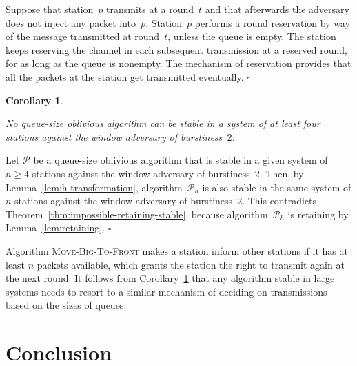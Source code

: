 \documentclass[11pt]{article}
\newcommand{\cP}{\mathcal{P}}
\newcommand{\qed}{\hfill $\square$ \smallbreak}
\newenvironment{proof}{\noindent{\bf Proof:}}{\qed}
\newtheorem{corollary}{Corollary}
\begin{document}
\begin{proof}
Suppose that station~$p$ transmits at a round~$t$ and that afterwards the adversary does not inject any packet into~$p$.
Station~$p$ performs a round reservation by way of the message transmitted at round~$t$, unless the queue is empty.
The station keeps reserving the channel in each subsequent transmission at a reserved round, for as long as the queue is nonempty. 
The mechanism of reservation provides that all the packets at the station get transmitted eventually.
\end{proof}



\begin{corollary}
\label{cor:impossible-queue-size-oblivious-stable}

No queue-size oblivious algorithm can be stable in a system of at least four stations against the   window adversary of burstiness~$2$.
\end{corollary}



\begin{proof}
Let $\cP$ be a queue-size oblivious algorithm that  is stable in a given system of $n\ge 4$ stations against the window adversary of burstiness~$2$.
Then, by Lemma~\ref{lem:h-transformation}, algorithm~$\cP_h$ is also stable in the same system of $n$ stations against the window adversary of burstiness~$2$.
This contradicts Theorem~\ref{thm:impossible-retaining-stable}, because algorithm~$\cP_h$ is retaining by Lemma~\ref{lem:retaining}.
\end{proof}


Algorithm \textsc{Move-Big-To-Front} makes a station inform other stations if it has at least $n$ packets available, which grants the station the right to transmit again at the next round.
It follows from Corollary~\ref{cor:impossible-queue-size-oblivious-stable} that any algorithm stable in large systems needs to resort to a similar mechanism of deciding on transmissions based on the sizes of queues.




\section{Conclusion}

\label{sec:conclusion}
\end{document}
